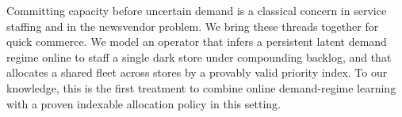 \documentclass[preprint,11pt,authoryear]{elsarticle}
\theoremstyle{remark}
\begin{document}
Committing capacity before uncertain demand is a classical concern in service staffing \citep{GansKooleMandelbaum2003} and in the newsvendor problem. We bring these threads together for quick commerce. We model an operator that infers a persistent latent demand regime online to staff a single dark store under compounding backlog, and that allocates a shared fleet across stores by a provably valid priority index. To our knowledge, this is the first treatment to combine online demand-regime learning with a proven indexable allocation policy in this setting.


\end{document}
